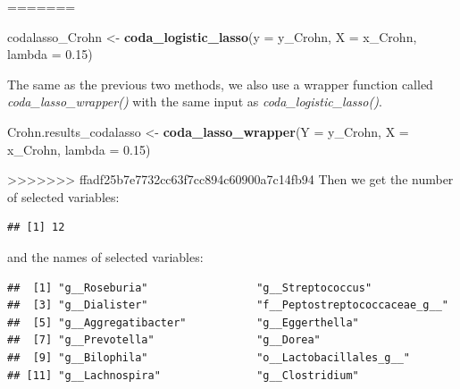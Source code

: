 \documentclass[openany]{book}
\newenvironment{Shaded}{\begin{snugshade}}{\end{snugshade}}
\newcommand{\KeywordTok}[1]{\textcolor[rgb]{0.13,0.29,0.53}{\textbf{#1}}}
\newcommand{\DataTypeTok}[1]{\textcolor[rgb]{0.13,0.29,0.53}{#1}}
\newcommand{\FloatTok}[1]{\textcolor[rgb]{0.00,0.00,0.81}{#1}}
\newcommand{\StringTok}[1]{\textcolor[rgb]{0.31,0.60,0.02}{#1}}
\newcommand{\OperatorTok}[1]{\textcolor[rgb]{0.81,0.36,0.00}{\textbf{#1}}}
\newcommand{\NormalTok}[1]{#1}
\begin{document}
=======

\begin{Shaded}
\begin{Highlighting}[]
\NormalTok{codalasso_Crohn <-}\StringTok{ }\KeywordTok{coda_logistic_lasso}\NormalTok{(}\DataTypeTok{y =}\NormalTok{ y_Crohn, }\DataTypeTok{X =}\NormalTok{ x_Crohn, }\DataTypeTok{lambda =} \FloatTok{0.15}\NormalTok{)}
\end{Highlighting}
\end{Shaded}

The same as the previous two methods, we also use a wrapper function
called \emph{coda\_lasso\_wrapper()} with the same input as
\emph{coda\_logistic\_lasso()}.

\begin{Shaded}
\begin{Highlighting}[]
\NormalTok{Crohn.results_codalasso <-}\StringTok{ }\KeywordTok{coda_lasso_wrapper}\NormalTok{(}\DataTypeTok{Y =}\NormalTok{ y_Crohn, }\DataTypeTok{X =}\NormalTok{ x_Crohn, }
                                              \DataTypeTok{lambda =} \FloatTok{0.15}\NormalTok{)}
\end{Highlighting}
\end{Shaded}

>>>>>>> ffadf25b7e7732cc63f7cc894c60900a7c14fb94
Then we get the number of selected variables:

\begin{Shaded}
\end{Shaded}

\begin{verbatim}
## [1] 12
\end{verbatim}

and the names of selected variables:

\begin{Shaded}
\end{Shaded}

\begin{verbatim}
##  [1] "g__Roseburia"                 "g__Streptococcus"            
##  [3] "g__Dialister"                 "f__Peptostreptococcaceae_g__"
##  [5] "g__Aggregatibacter"           "g__Eggerthella"              
##  [7] "g__Prevotella"                "g__Dorea"                    
##  [9] "g__Bilophila"                 "o__Lactobacillales_g__"      
## [11] "g__Lachnospira"               "g__Clostridium"
\end{verbatim}
\end{document}
